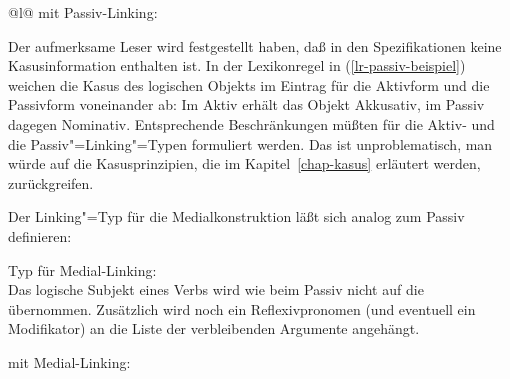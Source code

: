 \ex
\begin{tabular}[t]{@{}l@{}}
 mit Passiv-Linking:\\
\end{tabular}
\zl
Der aufmerksame Leser wird festgestellt haben, daß in den Spezifikationen keine
Kasusinformation enthalten ist. In der Lexikonregel in (\ref{lr-passiv-beispiel})
weichen die Kasus des logischen Objekts im Eintrag für die Aktivform und die Passivform
voneinander ab: Im Aktiv erhält das Objekt Akkusativ, im Passiv dagegen Nominativ.
Entsprechende Beschränkungen müßten für die Aktiv- und die Passiv"=Linking"=Typen
formuliert werden. Das ist unproblematisch, man würde auf die Kasusprinzipien,
die im Kapitel~\ref{chap-kasus} erläutert werden, zurückgreifen.

Der Linking"=Typ für die Medialkonstruktion läßt sich analog zum Passiv definieren:

\eas\label{constr-middle-linking}
Typ für Medial-Linking:\\
\zs
Das logische Subjekt eines Verbs wird wie beim Passiv
nicht auf die \subcatl übernommen. Zusätzlich wird noch ein Reflexivpronomen
(und eventuell ein Modifikator) an die Liste der verbleibenden Argumente 
angehängt.

\eas
{} mit Medial-Linking:\\
\zs

